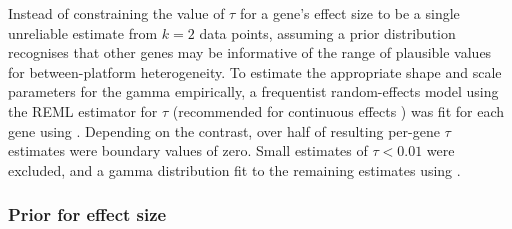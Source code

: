Instead of constraining the value of $\tau$ for a gene's effect size to be a single unreliable estimate from $k=2$ data points,
assuming a prior distribution recognises that other genes may be informative of the range of plausible values for between-platform heterogeneity.
To estimate the appropriate shape and scale parameters for the gamma empirically, 
a frequentist random-effects model using the \gls{REML} estimator for $\tau$ (recommended for continuous effects \autocite{veroniki2016MethodsEstimateBetweenstudy}) was fit for each gene using  \autocite{viechtbauer2010ConductingMetaAnalysesMetafor}.
Depending on the contrast, over half of resulting per-gene $\tau$ estimates were boundary values of zero.
Small estimates of $\tau < 0.01$ were excluded, and a gamma distribution fit to the remaining estimates using  \autocite{delignette-muller2015FitdistrplusPackageFitting}.

\subsubsection{Prior for effect size}

